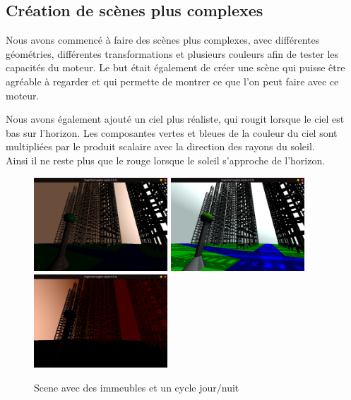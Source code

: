 
\subsection{Création de scènes plus complexes}
Nous avons commencé à faire des scènes plus complexes, avec différentes géométries, différentes transformations et plusieurs couleurs afin de tester les capacités du moteur. Le but était également de créer une scène qui puisse être agréable à regarder et qui permette de montrer ce que l'on peut faire avec ce moteur.\\ 
\par
Nous avons également ajouté un ciel plus réaliste, qui rougit lorsque le ciel est bas sur l'horizon. Les composantes vertes et bleues de la couleur du ciel sont multipliées par le produit scalaire avec la direction des rayons du soleil.\\
Ainsi il ne reste plus que le rouge lorsque le soleil s'approche de l'horizon.
\begin{figure}[h]
    \centering
    \includegraphics[width=5cm]{images/screens/ville1matin.png}
    \includegraphics[width=5cm]{images/screens/ville2jour.png}
    \includegraphics[width=5cm]{images/screens/ville3soir.png}
    \caption{Scene avec des immeubles et un cycle jour/nuit}
    \label{fig:city}
\end{figure}

